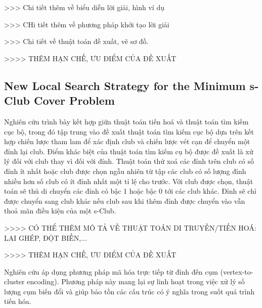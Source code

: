 >>> Chi tiết thêm về biểu diễn lời giải, hình ví dụ

>>> CHi tiết thêm về phương pháp khởi tạo lời giải

>>> Chi tiết về thuật toán đề xuất, vẽ sơ đồ.

>>>> THÊM HẠN CHẾ, ƯU ĐIỂM CỦA ĐỀ XUẤT


\subsection{New Local Search Strategy for the Minimum s-Club Cover Problem~\cite{dinh2025new}}

Nghiên cứu trình bày kết hợp giữa thuật toán tiến hoá và thuật toán tìm kiếm cục bộ, trong đó tập trung vào đề xuất thuật toán tìm kiếm cục bộ dựa trên kết hợp chiến lược tham lam để xác định club và chiến lược vét cạn để chuyển một đỉnh lại club. Điểm khác biệt của thuật toán tìm kiếm cụ bộ được đề xuất là xử lý đối với club thay vì đối với đỉnh. Thuật toán thử xoá các đỉnh trên club có số đỉnh ít nhất hoặc club được chọn ngẫu nhiên từ tập các club có số lượng đỉnh nhiều hơn số club có ít đỉnh nhất một tỉ lệ cho trước. Với club được chọn, thuật toán sẽ thủ di chuyển các đỉnh có bậc 1 hoặc bậc 0 tới các club khác. Đỉnh sẽ chỉ được chuyển sang club khác nếu club sau khi thêm đỉnh được chuyển vào vẫn thoả mãn điều kiện của một s-Club.


>>>> CÓ THỂ THÊM MÔ TẢ VỀ THUẬT TOÁN DI TRUYỀN/TIẾN HOÁ: LAI GHÉP, ĐỘT BIẾN,...

>>>> THÊM HẠN CHẾ, ƯU ĐIỂM CỦA ĐỀ XUẤT


Nghiên cứu áp dụng phương pháp mã hóa trực tiếp từ đỉnh đến cụm (vertex-to-cluster encoding). 
Phương pháp này mang lại sự linh hoạt trong việc xử lý số lượng cụm biến đổi và giúp bảo tồn các cấu trúc có ý nghĩa trong suốt quá trình tiến hóa.

